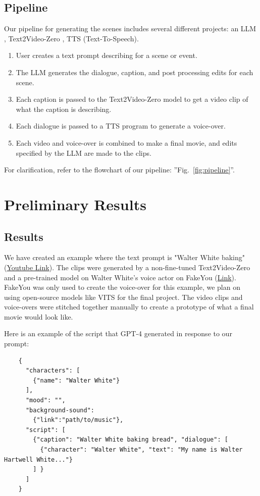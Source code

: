 \documentclass[conference]{IEEEtran}
\begin{document}
\subsection{Pipeline}
Our pipeline for generating the scenes includes several different projects: an LLM \cite{gpt4}, 
Text2Video-Zero \cite{text2vid}, TTS (Text-To-Speech).

\begin{enumerate}
    \item User creates a text prompt describing for a scene or event.
    \item The LLM generates the dialogue, caption, and post processing edits for each scene.
    \item Each caption is passed to the Text2Video-Zero \cite{text2vid} model to
    get a video clip of what the caption is describing.
    \item Each dialogue is passed to a TTS program to generate a voice-over.
    \item Each video and voice-over is combined to make a final movie, and edits specified by the LLM are made to the clips.
\end{enumerate}
For clarification, refer to the flowchart of our pipeline: ''Fig.~\ref{fig:pipeline}''.

\section{Preliminary Results}
\subsection{Results}
We have created an example where the text prompt is "Walter White baking" (\href{https://www.youtube.com/watch?v=lsVTRfqRHe0}{Youtube Link}).
The clips were generated by a non-fine-tuned Text2Video-Zero \cite{text2vid} and a pre-trained model
on Walter White's voice actor on FakeYou (\href{https://fakeyou.com/about}{Link}). FakeYou was
only used to create the voice-over for this example, we plan on using open-source models like
VITS \cite{vits} for the final project. The
video clips and voice-overs were stitched together manually to 
create a prototype of what a final movie would look like.

Here is an example of the script that GPT-4 \cite{gpt4} generated in response to our prompt:
\begin{tcolorbox}
\begin{lstlisting}
    {
      "characters": [
        {"name": "Walter White"}
      ],
      "mood": "",
      "background-sound": 
        {"link":"path/to/music"},
      "script": [ 
        {"caption": "Walter White baking bread", "dialogue": [
          {"character": "Walter White", "text": "My name is Walter Hartwell White..."}
        ] }
      ]
    }
\end{lstlisting}
\end{tcolorbox}
\end{document}

